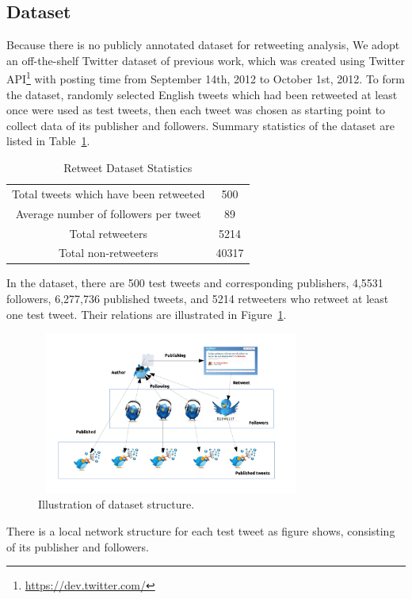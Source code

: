 \documentclass[smallcondensed]{svjour3}     %
\begin{document}
\subsection{Dataset}
Because there is no publicly annotated dataset for retweeting analysis, We adopt an off-the-shelf Twitter dataset of previous work\cite{Luo:2013RMF}, which was created using Twitter API\footnote{\url{https://dev.twitter.com/}} with posting time from September 14th, 2012 to October 1st, 2012.
To form the dataset, randomly selected English tweets which had been retweeted at least once were used as test tweets, then each tweet was chosen as starting point to collect data of its publisher and followers.
Summary statistics of the dataset are listed in Table~\ref{datasetstat}.
\begin{table}
\centering
\caption{Retweet Dataset Statistics}
\label{datasetstat}
\begin{tabular}{|c|c|}
\hline
Total tweets which have been retweeted & 500 \\
Average number of followers per tweet & 89 \\
Total retweeters & 5214 \\
Total non-retweeters & 40317  \\
\hline
\end{tabular}
\end{table}
In the dataset, there are 500 test tweets and corresponding publishers, 4,5531 followers, 6,277,736 published tweets, and 5214 retweeters who retweet at least one test tweet. 
Their relations are illustrated in Figure~\ref{fig:graph3}.
\begin{figure}[htb]
\centering%
\includegraphics[width=3.5in,height=2.1in]{dataset.pdf}
\caption{Illustration of dataset structure.}
\label{fig:graph3}
\end{figure}
There is a local network structure for each test tweet as figure shows, consisting of its publisher and followers.
\end{document}
